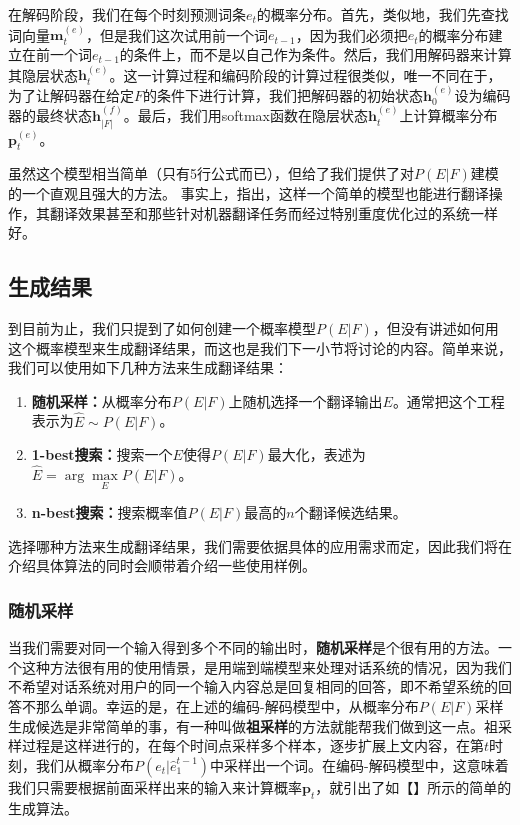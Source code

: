 \documentclass[10pt,a4paper]{ctexart}
\begin{document}
在解码阶段，我们在每个时刻预测词条$e_t$的概率分布。首先，类似地，我们先查找词向量$\textbf{m}_t^{(e)}$，但是我们这次试用前一个词$e_{t-1}$，因为我们必须把$e_t$的概率分布建立在前一个词$e_{t-1}$的条件上，而不是以自己作为条件。然后，我们用解码器来计算其隐层状态$\textbf{h}_t^{(e)}$。这一计算过程和编码阶段的计算过程很类似，唯一不同在于，为了让解码器在给定$F$的条件下进行计算，我们把解码器的初始状态$\textbf{h}_0^{(e)}$设为编码器的最终状态$\textbf{h}_{|F|}^{(f)}$。最后，我们用softmax函数在隐层状态$\textbf{h}_t^{(e)}$上计算概率分布$\textbf{p}_t^{(e)}$。

虽然这个模型相当简单（只有5行公式而已），但给了我们提供了对$P(E|F)$建模的一个直观且强大的方法。
事实上，\cite{sutskever2014sequence}指出，这样一个简单的模型也能进行翻译操作，其翻译效果甚至和那些针对机器翻译任务而经过特别重度优化过的系统一样好。

\subsection{生成结果}
到目前为止，我们只提到了如何创建一个概率模型$P(E|F)$，但没有讲述如何用这个概率模型来生成翻译结果，而这也是我们下一小节将讨论的内容。简单来说，我们可以使用如下几种方法来生成翻译结果：
\begin{enumerate}
\item[] \textbf{随机采样：}从概率分布$P(E|F)$上随机选择一个翻译输出$E$。通常把这个工程表示为$\hat{E} \sim P(E|F)$。
\item[] \textbf{1-best搜索：}搜索一个$E$使得$P(E|F)$最大化，表述为$\hat{E} = \arg\max \limits_{E} P(E|F)$。
\item[] \textbf{n-best搜索：}搜索概率值$P(E|F)$最高的$n$个翻译候选结果。
\end{enumerate}
选择哪种方法来生成翻译结果，我们需要依据具体的应用需求而定，因此我们将在介绍具体算法的同时会顺带着介绍一些使用样例。

\subsubsection{随机采样}
当我们需要对同一个输入得到多个不同的输出时，\textbf{随机采样}是个很有用的方法。一个这种方法很有用的使用情景，是用端到端模型来处理对话系统的情况，因为我们不希望对话系统对用户的同一个输入内容总是回复相同的回答，即不希望系统的回答不那么单调。幸运的是，在上述的编码-解码模型中，从概率分布$P(E|F)$采样生成候选是非常简单的事，有一种叫做\textbf{祖采样}的方法就能帮我们做到这一点。祖采样过程是这样进行的，在每个时间点采样多个样本，逐步扩展上文内容，在第$t$时刻，我们从概率分布$P(e_t | \hat{e}_1^{t-1})$中采样出一个词。在编码-解码模型中，这意味着我们只需要根据前面采样出来的输入来计算概率$\textbf{p}_t$，就引出了如【】所示的简单的生成算法。
\end{document}
